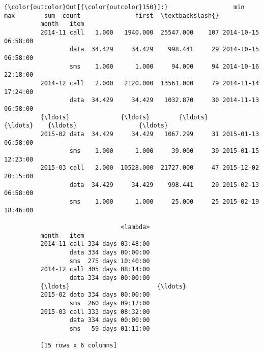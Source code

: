 \documentclass[11pt]{article}
\begin{document}
\begin{Verbatim}[commandchars=\\\{\}]
{\color{outcolor}Out[{\color{outcolor}150}]:}                  min        max        sum  count               first  \textbackslash{}
          month   item                                                            
          2014-11 call   1.000   1940.000  25547.000    107 2014-10-15 06:58:00   
                  data  34.429     34.429    998.441     29 2014-10-15 06:58:00   
                  sms    1.000      1.000     94.000     94 2014-10-16 22:18:00   
          2014-12 call   2.000   2120.000  13561.000     79 2014-11-14 17:24:00   
                  data  34.429     34.429   1032.870     30 2014-11-13 06:58:00   
          {\ldots}              {\ldots}        {\ldots}        {\ldots}    {\ldots}                 {\ldots}   
          2015-02 data  34.429     34.429   1067.299     31 2015-01-13 06:58:00   
                  sms    1.000      1.000     39.000     39 2015-01-15 12:23:00   
          2015-03 call   2.000  10528.000  21727.000     47 2015-12-02 20:15:00   
                  data  34.429     34.429    998.441     29 2015-02-13 06:58:00   
                  sms    1.000      1.000     25.000     25 2015-02-19 18:46:00   
          
                                <lambda>  
          month   item                    
          2014-11 call 334 days 03:48:00  
                  data 334 days 00:00:00  
                  sms  275 days 10:40:00  
          2014-12 call 305 days 08:14:00  
                  data 334 days 00:00:00  
          {\ldots}                        {\ldots}  
          2015-02 data 334 days 00:00:00  
                  sms  260 days 09:17:00  
          2015-03 call 333 days 08:32:00  
                  data 334 days 00:00:00  
                  sms   59 days 01:11:00  
          
          [15 rows x 6 columns]
\end{Verbatim}
            
\end{document}
